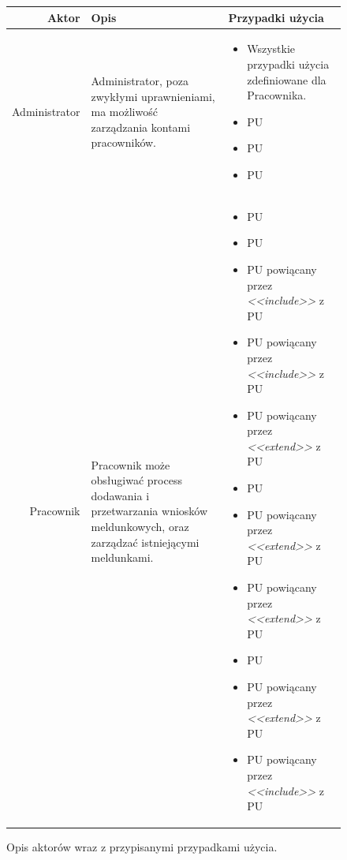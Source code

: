 \documentclass[12pt]{article}
\begin{document}
\begin{figure}[!h]
    \centering
    \begin{tabular}{|r|p{4cm}|p{10cm}|}
        \hline
        \textbf{Aktor} & \textbf{Opis} & \textbf{Przypadki użycia} \\
        \hline
        Administrator & 
        Administrator, poza zwykłymi uprawnieniami, ma możliwość zarządzania kontami pracowników.
        & 
        \begin{itemize}[noitemsep]
            \item Wszystkie przypadki użycia zdefiniowane dla Pracownika.
            \item PU \nameref{Stworzenie konta pracownika}
            \item PU \nameref{Edycja konta pracownika}
            \item PU \nameref{Usunięcie konta pracownika}
        \end{itemize}
        \\
        \hline
        Pracownik & 
        Pracownik może obsługiwać process dodawania i przetwarzania wniosków meldunkowych, oraz zarządzać istniejącymi meldunkami.
        & 
        \begin{itemize}[noitemsep]
            \item PU \nameref{Zalogowanie}
            \item PU \nameref{Wylogowanie}
            \item PU \nameref{Dodanie wniosku} powiącany przez \textit{<<include>>} z PU \nameref{Sprawdzenie poprawności danych}
            \item PU \nameref{Edycja danych wniosku} powiącany przez \textit{<<include>>} z PU \nameref{Sprawdzenie poprawności danych}
            \item PU \nameref{Zmiana statusu wniosku} powiącany przez \textit{<<extend>>} z PU \nameref{Edycja danych wniosku}
            \item PU \nameref{Wyświetlanie wniosków}
            \item PU \nameref{Zmiana kryterium wyświetlania wniosków} powiącany przez \textit{<<extend>>} z PU \nameref{Wyświetlanie wniosków}
            \item PU \nameref{Dodanie meldunku} powiącany przez \textit{<<extend>>} z PU \nameref{Zmiana statusu wniosku}
            \item PU \nameref{Wyświetlanie meldunków}
            \item PU \nameref{Zmiana kryterium wyświetlania meldunków} powiącany przez \textit{<<extend>>} z PU \nameref{Wyświetlanie meldunków}
            \item PU \nameref{Edycja danych meldunku} powiącany przez \textit{<<include>>} z PU \nameref{Sprawdzenie poprawności danych}

        \end{itemize}
        \\
        \hline
    \end{tabular}
    \caption{Opis aktorów wraz z przypisanymi przypadkami użycia.}
\end{figure}
\end{document}

